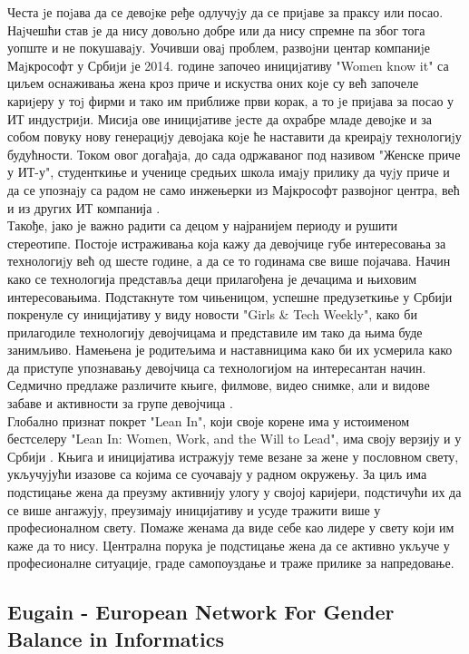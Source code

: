 \documentclass[a4paper]{article}
\begin{document}
Честа jе поjава да се девоjке ређе одлучуjу да се приjаве за праксу
или посао. Наjчешћи став jе да нису довољно добре или да нису
спремне па због тога уопште и не покушаваjу. Уочивши оваj проблем,
развоjни центар компаниjе Маjкрософт у Србиjи jе 2014. године започео 
инициjативу "Women know it" са циљем оснаживања жена кроз
приче и искуства оних коjе су већ започеле кариjеру у тоj фирми и
тако им приближе први корак, а то jе приjава за посао у ИТ индустриjи. 
Мисиjа ове инициjативе jесте да охрабре младе девоjке и за
собом повуку нову генерациjу девоjака коjе ће наставити да креираjу
технологиjу будућности. Током овог догађаjа, до сада одржаваног
под називом "Женске приче у ИТ-у", студенткиње и ученице средњих школа имаjу 
прилику да чуjу приче и да се упознаjу са радом не само инжењерки из Мајкрософт 
развојног центра, већ и из других ИТ компанија \cite{microsoft}.\\

Такође, јако је важно радити са децом у најранијем периоду и рушити стереотипе. Постоје 
истраживања која кажу да девојчице губе интересовања за технологиjу већ од шесте 
године, а да се то годинама све више појачава. Начин како се технологија 
представља деци прилагођена је дечацима и њиховим интересовањима. Подстакнуте 
том чињеницом, успешне предузеткиње у Србији покренуле су иницијативу у виду 
новости "Girls \& Tech Weekly", како би прилагодиле технологију девојчицама и 
представиле им тако да њима буде занимљиво. Намењена је родитељима и наставницима 
како би их усмерила како да приступе упознавању девојчица са технологијом на 
интересантан начин. Седмично предлаже различите књиге, филмове, видео снимке, али 
и видове забаве и активности за групе девојчица \cite{girls}.\\

Глобално признат покрет "Lean In", који своје корене има у истоименом бестселеру
"Lean In: Women, Work, and the Will to Lead", има своју верзију и у Србији \cite{lean}. 
Књига и иницијатива истражују теме везане за жене у пословном свету, укључујући изазове 
са којима се суочавају у радном окружењу. За циљ има подстицање жена да преузму
активнију улогу у својој каријери, подстичући их да се више ангажују, преузимају 
иницијативу и усуде тражити више у професионалном свету. Помаже женама да виде 
себе као лидере у свету који им каже да то нису. Централна порука је подстицање 
жена да се активно укључе у професионалне ситуације, граде самопоуздање и траже 
прилике за напредовање.


\subsection{Eugain - European Network For Gender Balance in Informatics}
\label{subsec:podnaslov3}
\end{document}
